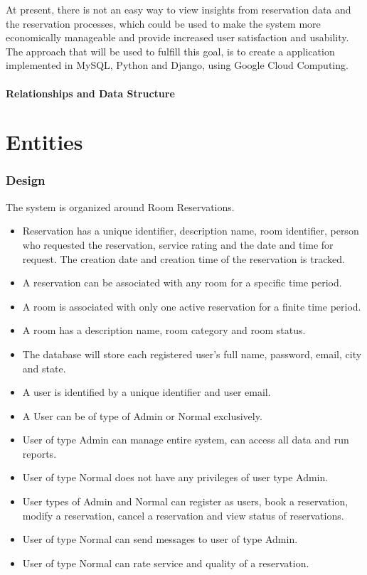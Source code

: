 \documentclass[11pt]{report}
\begin{document}
At present, there is not an easy way to view insights from reservation data and the reservation processes, which could be used to make the system more economically manageable and provide increased user satisfaction and usability.  The approach that will be used to fulfill this goal, is to create a application implemented in MySQL, Python and Django, using Google Cloud Computing. 

\paragraph{Relationships and Data Structure}

\section*{Entities}
\subsubsection{Design}
The system is organized around Room Reservations. 
\begin{itemize}
\item Reservation has a unique identifier, description name, room identifier, person who requested the reservation, service rating and the date and time for request. The creation date and creation time of the reservation is tracked. \item A reservation can be associated with any room for a specific time period.
\item A room is associated with only one active reservation for a finite time period.
\item A room has a description name, room category and room status.
\item The database will store each registered user's full name, password, email, city and state.
\item A user is identified by a unique identifier and user email.
\item A User can be of type of Admin or Normal exclusively.
\item User of type Admin can manage entire system, can access all data and run reports.
\item User of type Normal does not have any privileges of user type Admin.
\item User types of Admin and Normal can register as users, book a reservation, modify a reservation, cancel a reservation and view status of reservations.
\item User of type Normal can send messages to user of type Admin.
\item User of type Normal can rate service and quality of a reservation.
\end{itemize}
\end{document}
